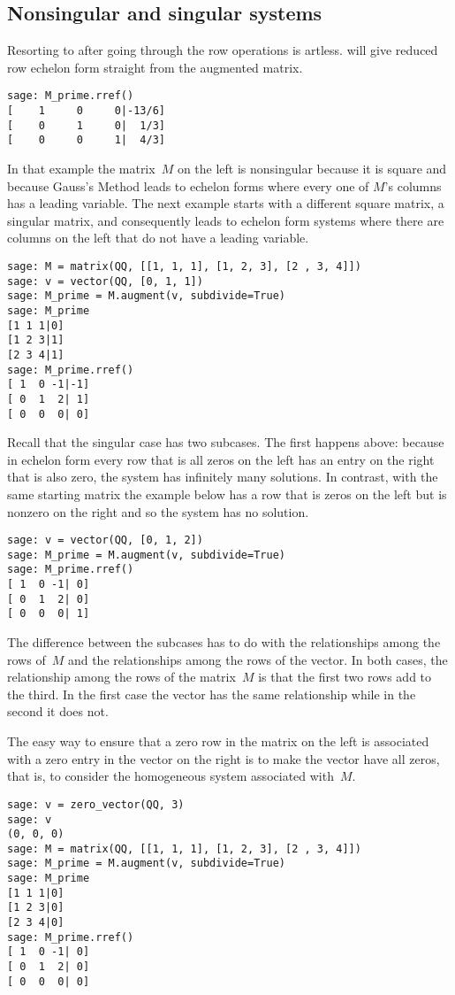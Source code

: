 \subsection{Nonsingular and singular systems}
Resorting to  after going through the row operations is artless.
\Sage{} will give reduced row echelon form straight from the augmented matrix.
\begin{lstlisting}
sage: M_prime.rref()
[    1     0     0|-13/6]
[    0     1     0|  1/3]
[    0     0     1|  4/3]
\end{lstlisting}

In that example the matrix~$M$ on the left is nonsingular because it is 
square and because Gauss's Method leads to echelon forms where every one of
$M$'s columns has a leading variable.
The next example starts with a different square matrix, a 
singular matrix, and consequently leads to 
echelon form systems where there are columns on the left 
that do not have a leading variable. 
\begin{lstlisting}
sage: M = matrix(QQ, [[1, 1, 1], [1, 2, 3], [2 , 3, 4]])    
sage: v = vector(QQ, [0, 1, 1]) 
sage: M_prime = M.augment(v, subdivide=True)
sage: M_prime
[1 1 1|0]
[1 2 3|1]
[2 3 4|1]
sage: M_prime.rref()
[ 1  0 -1|-1]
[ 0  1  2| 1]
[ 0  0  0| 0]  
\end{lstlisting}
Recall that the singular case  
has two subcases.
The first happens above: because in echelon form
every row that is all zeros on the
left has an entry on the right that is also zero,
the system has infinitely many solutions.
In contrast, with the same starting matrix
the example below has a row that is zeros on the left but is nonzero
on the right and so the system has no solution.
\begin{lstlisting}
sage: v = vector(QQ, [0, 1, 2])             
sage: M_prime = M.augment(v, subdivide=True)
sage: M_prime.rref()                        
[ 1  0 -1| 0]
[ 0  1  2| 0]
[ 0  0  0| 1]
\end{lstlisting}
The difference between the subcases
has to do with the relationships among  
the rows of~$M$ and the relationships among the rows of the vector.
In both cases, the relationship among the rows of the matrix~$M$
is that the first two rows add to the third.
In the first case the vector has the same relationship while in the second
it does not.

The easy way to ensure that a zero row in the matrix 
on the left is associated with a zero
entry in the vector on the right is to make the vector have all zeros, that is,
to consider the homogeneous system associated with~$M$.
\begin{lstlisting}
sage: v = zero_vector(QQ, 3)
sage: v
(0, 0, 0)
sage: M = matrix(QQ, [[1, 1, 1], [1, 2, 3], [2 , 3, 4]]) 
sage: M_prime = M.augment(v, subdivide=True)
sage: M_prime
[1 1 1|0]
[1 2 3|0]
[2 3 4|0]
sage: M_prime.rref()
[ 1  0 -1| 0]
[ 0  1  2| 0]
[ 0  0  0| 0]
\end{lstlisting}

